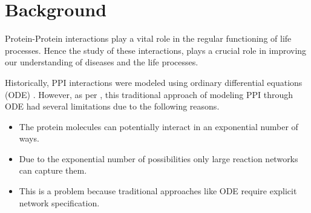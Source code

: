 \documentclass[msc,deptreport,ai]{infthesis}      %
\begin{document}







\chapter{Background}
Protein-Protein interactions play a vital role in the regular functioning of life processes. Hence the study of these interactions, plays a crucial role in improving our understanding of diseases and the life processes.

Historically, PPI interactions were modeled using ordinary differential equations (ODE) \cite{ode}. However, as per \cite{rule-based-general}, this traditional approach of modeling PPI through ODE had several limitations due to the following reasons.

\begin{itemize}
\item
The protein molecules can potentially interact in an exponential number of ways. 
\item
Due to the exponential number of possibilities only large reaction networks can capture them.
\item
This is a problem because traditional approaches like ODE require explicit network specification.
\end{itemize}
\end{document}
